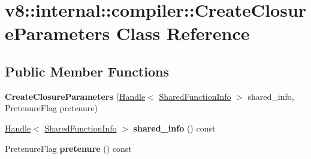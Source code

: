 \hypertarget{classv8_1_1internal_1_1compiler_1_1_create_closure_parameters}{}\section{v8\+:\+:internal\+:\+:compiler\+:\+:Create\+Closure\+Parameters Class Reference}
\label{classv8_1_1internal_1_1compiler_1_1_create_closure_parameters}
\subsection*{Public Member Functions}
\begin{DoxyCompactItemize}
\item 
{\bfseries Create\+Closure\+Parameters} (\hyperlink{classv8_1_1internal_1_1_handle}{Handle}$<$ \hyperlink{classv8_1_1internal_1_1_shared_function_info}{Shared\+Function\+Info} $>$ shared\+\_\+info, Pretenure\+Flag pretenure)\hypertarget{classv8_1_1internal_1_1compiler_1_1_create_closure_parameters_a54db5c262effd4af23cd09d135ec971c}{}\label{classv8_1_1internal_1_1compiler_1_1_create_closure_parameters_a54db5c262effd4af23cd09d135ec971c}

\item 
\hyperlink{classv8_1_1internal_1_1_handle}{Handle}$<$ \hyperlink{classv8_1_1internal_1_1_shared_function_info}{Shared\+Function\+Info} $>$ {\bfseries shared\+\_\+info} () const \hypertarget{classv8_1_1internal_1_1compiler_1_1_create_closure_parameters_a7e03461df18e459d16ab30c8b395fba4}{}\label{classv8_1_1internal_1_1compiler_1_1_create_closure_parameters_a7e03461df18e459d16ab30c8b395fba4}

\item 
Pretenure\+Flag {\bfseries pretenure} () const \hypertarget{classv8_1_1internal_1_1compiler_1_1_create_closure_parameters_a682ab80cf606be648fb5119be33654cc}{}\label{classv8_1_1internal_1_1compiler_1_1_create_closure_parameters_a682ab80cf606be648fb5119be33654cc}

\end{DoxyCompactItemize}

